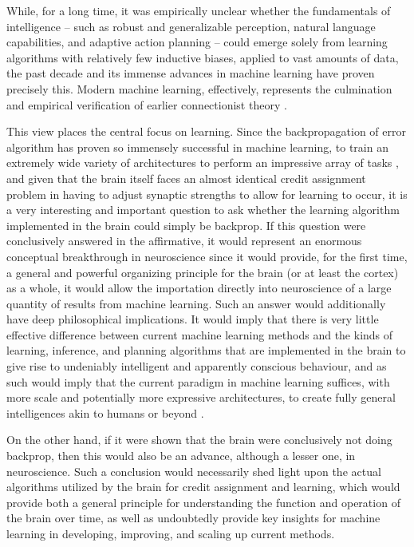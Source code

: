While, for a long time, it was empirically unclear whether the fundamentals of intelligence -- such as robust and generalizable perception, natural language capabilities, and adaptive action planning -- could emerge solely from learning algorithms with relatively few inductive biases, applied to vast amounts of data, the past decade and its immense advances in machine learning have proven precisely this. Modern machine learning, effectively, represents the culmination and empirical verification of earlier connectionist theory \citep{rumelhart1986learning}.

This view places the central focus on learning. Since the backpropagation of error algorithm has proven so immensely successful in machine learning, to train an extremely wide variety of architectures to perform an impressive array of tasks \citep{krizhevsky2012imagenet,goodfellow2014generative,radford2019language,schrittwieser2019mastering,schmidhuber1999artificial}, and given that the brain itself faces an almost identical credit assignment problem in having to adjust synaptic strengths to allow for learning to occur, it is a very interesting and important question to ask whether the learning algorithm implemented in the brain could simply be backprop. If this question were conclusively answered in the affirmative, it would represent an enormous conceptual breakthrough in neuroscience since it would provide, for the first time, a general and powerful organizing principle for the brain (or at least the cortex) as a whole, it would allow the importation directly into neuroscience of a large quantity of results from machine learning. Such an answer would additionally have deep philosophical implications. It would imply that there is very little effective difference between current machine learning methods and the kinds of learning, inference, and planning algorithms that are implemented in the brain to give rise to undeniably intelligent and apparently conscious behaviour, and as such would imply that the current paradigm in machine learning suffices, with more scale and potentially more expressive architectures, to create fully general intelligences akin to humans or beyond \citep{bostrom2017superintelligence}.

On the other hand, if it were shown that the brain were conclusively not doing backprop, then this would also be an advance, although a lesser one, in neuroscience. Such a conclusion would necessarily shed light upon the actual algorithms utilized by the brain for credit assignment and learning, which would provide both a general principle for understanding the function and operation of the brain over time, as well as undoubtedly provide key insights for machine learning in developing, improving, and scaling up current methods. 

